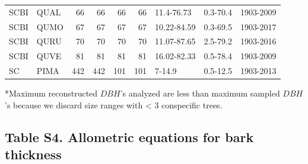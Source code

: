 \documentclass[
]{article}
\begin{document}
\begin{table}[!h]
{\begin{tabular}{llrrrrlll}
\addlinespace
SCBI & QUAL & 66 & 66 & 66 & 66 & 11.4-76.73 & 0.3-70.4 & 1903-2009\\
\addlinespace
SCBI & QUMO & 67 & 67 & 67 & 67 & 10.22-84.59 & 0.3-69.5 & 1903-2017\\
\addlinespace
SCBI & QURU & 70 & 70 & 70 & 70 & 11.07-87.65 & 2.5-79.2 & 1903-2016\\
\addlinespace
SCBI & QUVE & 81 & 81 & 81 & 81 & 16.02-82.33 & 0.5-78.4 & 1903-2009\\
\addlinespace
SC & PIMA & 442 & 442 & 101 & 101 & 7-14.9 & 0.5-12.5 & 1903-2013\\
\bottomrule
\end{tabular}}
\end{table}

*Maximum reconstructed \(DBH\)'s analyzed are less than maximum sampled
\(DBH\)'s because we discard size ranges with \textless{} 3 conspecific
trees.

\newpage

\hypertarget{table-s4.-allometric-equations-for-bark-thickness}{%
\subsection{Table S4. Allometric equations for bark
thickness}\label{table-s4.-allometric-equations-for-bark-thickness}}
\end{document}
